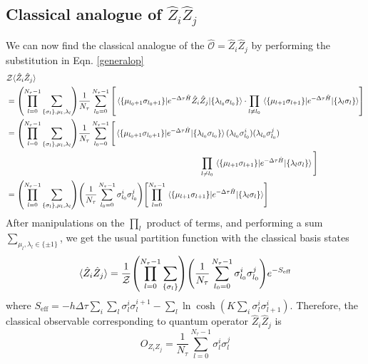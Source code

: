\documentclass[../thesis_main.tex]{subfiles}
\begin{document}
\subsection{Classical analogue of $\hat{Z}_i \hat{Z}_j$}
We can now find the classical analogue of the $ \hat{\mathcal{O}} =  \hat{Z}_i \hat{Z}_j$ by performing the substitution in Eqn. \eqref{generalop}
\begin{align*}
    & \mathcal{Z} \langle {\hat{Z}_i \hat{Z}_j} \rangle \\
    & = \qty(\prod_{l=0}^{N_\tau - 1} \sum_{\{\sigma_l \}, \mu_l, \lambda_l}) \frac{1}{N_\tau} \sum_{l_0 = 0}^{N_\tau - 1} \qty[\mel{\{\mu_{l_0+1} \sigma _{l_0+1}\}}{e^{-\Delta \tau \hat{H}} {\hat{Z}_i \hat{Z}_j}}{\{\lambda_{l_0} \sigma _{l_0}\}} \cdot \prod_{l \neq l_0} \mel{\{\mu_{l+1} \sigma _{l+1}\}}{e^{-\Delta \tau \hat{H}}}{\{\lambda_{l} \sigma _{l}\}} ] \\
    & =  \qty(\prod_{l=0}^{N_\tau - 1} \sum_{\{\sigma_l \}, \mu_l, \lambda_l}) \frac{1}{N_\tau} \sum_{l_0 = 0}^{N_\tau - 1} \Bigg[\mel{\{\mu_{l_0+1} \sigma _{l_0+1}\}}{e^{-\Delta \tau \hat{H}}}{\{\lambda_{l_0} \sigma _{l_0}\}} (\lambda_{l_0} \sigma^i_{l_0})(\lambda_{l_0} \sigma^j_{l_0}) \\ 
    & \qquad \qquad \qquad \qquad \qquad \qquad \qquad \qquad \qquad \qquad \qquad \qquad \prod_{l \neq l_0} \mel{\{\mu_{l+1} \sigma _{l+1}\}}{e^{-\Delta \tau \hat{H}}}{\{\lambda_{l} \sigma _{l}\}}\Bigg] \\
    & = \qty(\prod_{l=0}^{N_\tau - 1} \sum_{\{\sigma_l \}, \mu_l, \lambda_l}) \qty(\frac{1}{N_\tau} \sum_{l_0 = 0}^{N_\tau - 1} \sigma^i_{l_0} \sigma^j_{l_0}) \qty[\prod_{l = 0}^{N_\tau - 1} \mel{\{\mu_{l+1} \sigma _{l+1}\}}{e^{-\Delta \tau \hat{H}}}{\{\lambda_{l} \sigma _{l}\}} ]
\end{align*} 
After manipulations on the $\prod_l$ product of terms, and performing a sum $\sum_{\mu_l, \lambda_l \in \{\pm 1\}}$, we get the usual partition function with the classical basis states 
\[
    \langle {\hat{Z}_i \hat{Z}_j} \rangle = \frac{1}{\mathcal{Z}} \qty(\prod_{l=0}^{N_\tau - 1} \sum_{\{\sigma_l \}}) \qty(\frac{1}{N_\tau} \sum_{l_0 = 0}^{N_\tau - 1} \sigma^i_{l_0} \sigma^j_{l_0}) e^{-S_\text{eff}}
\]   
where $S_\text{eff} = -h \Delta \tau \sum_{i}\sum_{l} \sigma^i_l \sigma^{i+1}_l - \sum_l \ln\cosh(K \sum_i \sigma^i_l \sigma^i_{l+1})$. Therefore, the classical observable corresponding to quantum operator $\hat{Z}_i \hat{Z}_j$ is 
\begin{equation}
    \boxed{
        O_{Z_i Z_j} = \frac{1}{N_\tau} \sum_{l = 0}^{N_\tau - 1} \sigma^i_{l} \sigma^j_{l}
    }
    \label{classicalzizj}
\end{equation}  
\end{document}
